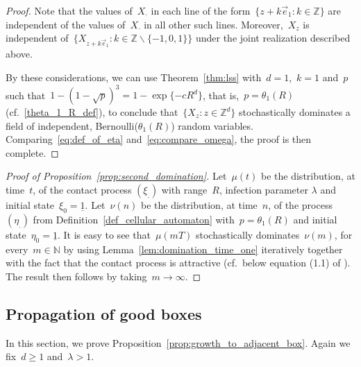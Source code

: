 \documentclass[a4paper,12pt]{article}
\newtheorem  {corollary}     [theorem]{Corollary}
\newcommand{\Z}{\mathbb{Z}}
\begin{document}
\begin{proof}
\smallskip

Note that the values of~$X_\cdot$ in each line of the form~$\{z + k\vec{e}_1:k \in \Z\}$ are independent of the values of~$X_\cdot$ in all other such lines. Moreover,~$X_z$ is independent of~$\{X_{z + k\vec{e}_1}: k \in \Z\backslash \{-1,0,1\}\}$ under the joint realization described above.

\smallskip

By these considerations, we can use Theorem~\ref{thm:lss} with~$d=1$,~$k=1$ and~$p$ such that~$1-(1-\sqrt{p})^3 = 1 - \exp\{-cR^d\}$, that is,~$p = \theta_1(R)$ (cf.\ \eqref{theta_1_R_def}), to conclude that~$\{X_z:z \in \Z^d\}$ stochastically dominates a field of independent, Bernoulli($\theta_1(R)$) random variables. Comparing~\eqref{eq:def_of_eta} and~\eqref{eq:compare_omega}, the proof is then complete.
\end{proof}

\begin{proof}[Proof of Proposition~\ref{prop:second_domination}]
 Let~$\mu(t)$ be the distribution, at time~$t$, of the contact process $(\xi_.)$  with range~$R$, infection parameter $\lambda$ and initial state~$\xi_0  = \underline{1}$. Let~$\nu(n)$ be the distribution, at time~$n$, of the process $(\eta_.)$ from Definition~\ref{def_cellular_automaton} with~$p = \theta_1(R)$ and initial state~$\eta_0 = \underline{1}$. It is easy to see that~$\mu(mT)$ stochastically dominates~$\nu(m)$, for every~$m \in \mathbb{N}$ by using Lemma~\ref{lem:domination_time_one} iteratively together with the fact that the contact process is attractive (cf.\ below equation (1.1) of \cite[Part 1, Section 1]{Li99}).
  The result then follows by taking~$m \to \infty$.
\end{proof}








\subsection{Propagation of good boxes}
\label{ss:propagation}



In this section, we prove Proposition~\ref{prop:growth_to_adjacent_box}. Again we fix~$d \geq 1$ and~$\lambda > 1$.
\end{document}
